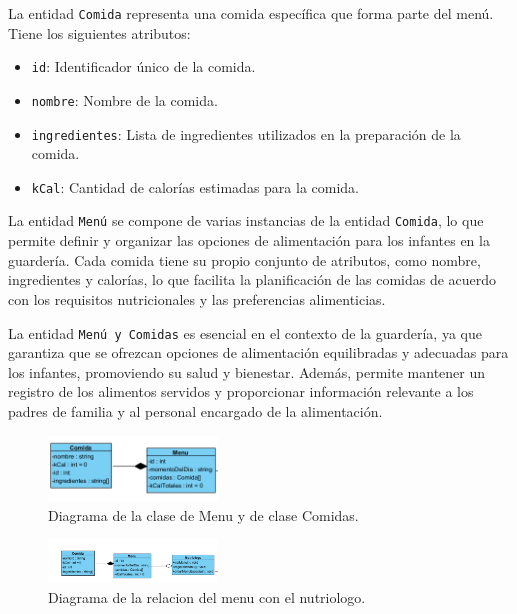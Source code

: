 La entidad \texttt{Comida} representa una comida específica que forma parte del menú. Tiene los siguientes atributos:

\begin{itemize}
\item \texttt{id}: Identificador único de la comida.
\item \texttt{nombre}: Nombre de la comida.
\item \texttt{ingredientes}: Lista de ingredientes utilizados en la preparación de la comida.
\item \texttt{kCal}: Cantidad de calorías estimadas para la comida.
\end{itemize}

La entidad \texttt{Menú} se compone de varias instancias de la entidad \texttt{Comida}, lo que permite definir y organizar las opciones de alimentación para los infantes en la guardería. Cada comida tiene su propio conjunto de atributos, como nombre, ingredientes y calorías, lo que facilita la planificación de las comidas de acuerdo con los requisitos nutricionales y las preferencias alimenticias.

La entidad \texttt{Menú y Comidas} es esencial en el contexto de la guardería, ya que garantiza que se ofrezcan opciones de alimentación equilibradas y adecuadas para los infantes, promoviendo su salud y bienestar. Además, permite mantener un registro de los alimentos servidos y proporcionar información relevante a los padres de familia y al personal encargado de la alimentación.



\begin{figure}[htbp]
\centering
\includegraphics[width=0.4\textwidth]{images/arqui/menuComida.png}
\caption{Diagrama de la clase de Menu y de clase Comidas.}
\label{fig:entidamenucomida}
\end{figure}


\begin{figure}[htbp]
\centering
\includegraphics[width=0.4\textwidth]{images/arqui/comimennutr.png}
\caption{Diagrama de la relacion del menu con el nutriologo.}
\label{fig:entidamenucomida}
\end{figure}

